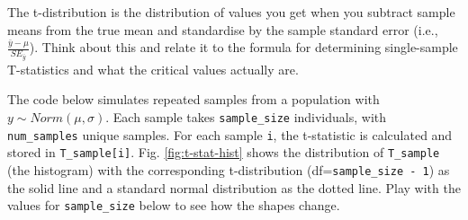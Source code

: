 \documentclass[
  11pt,
  a4paper,
]{book}
\begin{document}
The t-distribution is the distribution of values you get when you subtract sample means from the true mean and standardise by the sample standard error (i.e., \(\frac{\bar{y} - \mu}{SE_{\bar{y}}}\)). Think about this and relate it to the formula for determining single-sample T-statistics and what the critical values actually are.

The code below simulates repeated samples from a population with \(y \sim Norm(\mu, \sigma)\). Each sample takes \texttt{sample\_size} individuals, with \texttt{num\_samples} unique samples. For each sample \texttt{i}, the t-statistic is calculated and stored in \texttt{T\_sample{[}i{]}}. Fig. \ref{fig:t-stat-hist} shows the distribution of \texttt{T\_sample} (the histogram) with the corresponding t-distribution (df=\texttt{sample\_size\ -\ 1}) as the solid line and a standard normal distribution as the dotted line. Play with the values for \texttt{sample\_size} below to see how the shapes change.
\end{document}
